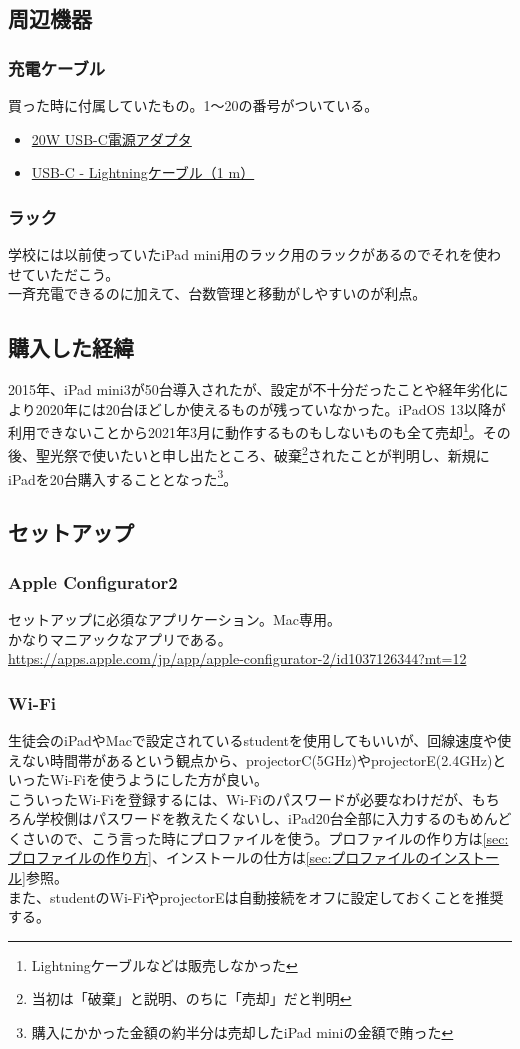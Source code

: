 \documentclass[dvipdfmx,jb5]{jreport}
\newcommand{\link}[2]{\href{#2}{#1}}
\begin{document}
\subsection{周辺機器}
\subsubsection{充電ケーブル}
買った時に付属していたもの。1〜20の番号がついている。
\begin{itemize}
      \item \link{20W USB-C電源アダプタ}{https://apple.co/3xeTw5G}
      \item \link{USB-C - Lightningケーブル（1 m）}{https://apple.co/3cGxn6D}
\end{itemize}
\subsubsection{ラック}
学校には以前使っていたiPad mini用のラック用のラックがあるのでそれを使わせていただこう。\\一斉充電できるのに加えて、台数管理と移動がしやすいのが利点。
\subsection{購入した経緯}
2015年、iPad mini3が50台導入されたが、設定が不十分だったことや経年劣化により2020年には20台ほどしか使えるものが残っていなかった。iPadOS 13以降が利用できないことから2021年3月に動作するものもしないものも全て売却\footnote{Lightningケーブルなどは販売しなかった}。その後、聖光祭で使いたいと申し出たところ、破棄\footnote{当初は「破棄」と説明、のちに「売却」だと判明}されたことが判明し、新規にiPadを20台購入することとなった\footnote{購入にかかった金額の約半分は売却したiPad miniの金額で賄った}。
\subsection{セットアップ}\label{sec:iPadのセットアップ}
\subsubsection{Apple Configurator2}
セットアップに必須なアプリケーション。Mac専用。\\
かなりマニアックなアプリである。\\
\url{https://apps.apple.com/jp/app/apple-configurator-2/id1037126344?mt=12}
\subsubsection{Wi-Fi}
生徒会のiPadやMacで設定されているstudentを使用してもいいが、回線速度や使えない時間帯があるという観点から、projectorC(5GHz)やprojectorE(2.4GHz)といったWi-Fiを使うようにした方が良い。\\
こういったWi-Fiを登録するには、Wi-Fiのパスワードが必要なわけだが、もちろん学校側はパスワードを教えたくないし、iPad20台全部に入力するのもめんどくさいので、こう言った時にプロファイルを使う。プロファイルの作り方は\ref{sec:プロファイルの作り方}、インストールの仕方は\ref{sec:プロファイルのインストール}参照。\\
また、studentのWi-FiやprojectorEは自動接続をオフに設定しておくことを推奨する。
\end{document}
